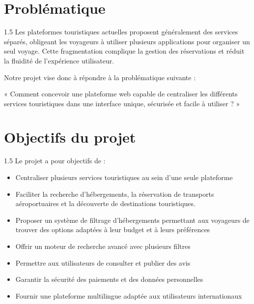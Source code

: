 \documentclass[a4paper,12pt]{report}
\begin{document}
\section{Problématique}
\vspace{0.5cm}
\begin{spacing}{1.5}
\justifying
Les plateformes touristiques actuelles proposent généralement des services séparés, obligeant les voyageurs à utiliser plusieurs applications pour organiser un seul voyage. Cette fragmentation complique la gestion des réservations et réduit la fluidité de l'expérience utilisateur.

Notre projet vise donc à répondre à la problématique suivante :

« Comment concevoir une plateforme web capable de centraliser les différents services touristiques dans une interface unique, sécurisée et facile à utiliser ? »

\end{spacing}

\section{Objectifs du projet}
\vspace{0.5cm}
\begin{spacing}{1.5}
\justifying
Le projet a pour objectifs de :

\begin{itemize}
    \item Centraliser plusieurs services touristiques au sein d'une seule plateforme
    \item Faciliter la recherche d'hébergements, la réservation de transports aéroportuaires et la découverte de destinations touristiques.
    \item Proposer un système de filtrage d'hébergements permettant aux voyageurs de trouver des options adaptées à leur budget et à leurs préférences
    \item Offrir un moteur de recherche avancé avec plusieurs filtres
    \item Permettre aux utilisateurs de consulter et publier des avis
    \item Garantir la sécurité des paiements et des données personnelles
    \item Fournir une plateforme multilingue adaptée aux utilisateurs internationaux
\end{itemize}

\end{spacing}
\end{document}
